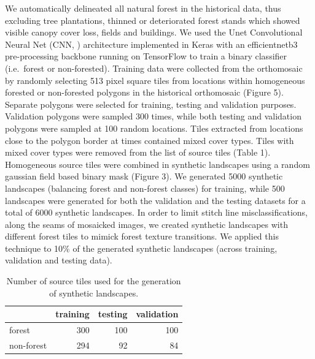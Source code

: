\documentclass[remote sensing,article,submit,moreauthors,pdftex]{mdpi}
\begin{document}
We automatically delineated all natural forest in the historical data,
thus excluding tree plantations, thinned or deteriorated forest stands
which showed visible canopy cover loss, fields and buildings. We used
the Unet Convolutional Neural Net (CNN, \citet{ronneberger2015})
architecture implemented in Keras \citep{chollet2015} with an
efficientnetb3 pre-processing backbone \citep{yakubovskiy2019} running
on TensorFlow \citep{martinabadi2015} to train a binary classifier
(i.e.~forest or non-forested). Training data were collected from the
orthomosaic by randomly selecting 513 pixel square tiles from locations
within homogeneous forested or non-forested polygons in the historical
orthomosaic (Figure 5). Separate polygons were selected for training,
testing and validation purposes. Validation polygons were sampled 300
times, while both testing and validation polygons were sampled at 100
random locations. Tiles extracted from locations close to the polygon
border at times contained mixed cover types. Tiles with mixed cover
types were removed from the list of source tiles (Table 1). Homogeneous
source tiles were combined in synthetic landscapes using a random
gaussian field based binary mask (Figure 3). We generated 5000 synthetic
landscapes (balancing forest and non-forest classes) for training, while
500 landscapes were generated for both the validation and the testing
datasets for a total of 6000 synthetic landscapes. In order to limit
stitch line misclassifications, along the seams of mosaicked images, we
created synthetic landscapes with different forest tiles to mimick
forest texture transitions. We applied this technique to 10\% of the
generated synthetic landscapes (across training, validation and testing
data).

\begin{table}[!h]

\caption{\label{tab:unnamed-chunk-3}Number of source tiles used for the generation of synthetic landscapes.}
\centering
\begin{tabular}[t]{lrrr}
\toprule
  & training & testing & validation\\
\midrule
forest & 300 & 100 & 100\\
non-forest & 294 & 92 & 84\\
\bottomrule
\end{tabular}
\end{table}
\end{document}
